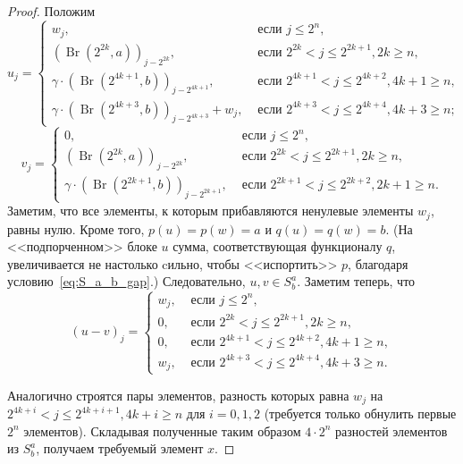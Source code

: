 \begin{proof}
	Положим
	\begin{equation}
		u_j = \begin{cases}
			w_j,  & \mbox{~если~} j \leq 2^n,
			\\
			(\operatorname{Br}(2^{2k  },a))_{j-2^{2k}},  & \mbox{~если~} 2^{2k} < j \leq 2^{2k+1}, 2k \geq n,
			\\
			\gamma\cdot(\operatorname{Br}(2^{4k+1},b))_{j-2^{4k+1}},  & \mbox{~если~} 2^{4k+1} < j \leq 2^{4k+2}, 4k + 1 \geq n,
			\\
			\gamma\cdot(\operatorname{Br}(2^{4k+3},b))_{j-2^{4k+3}} + w_j,  & \mbox{~если~} 2^{4k+3} < j \leq 2^{4k+4}, 4k + 3 \geq n
			;
		\end{cases}
	\end{equation}
	\begin{equation}
		v_j = \begin{cases}
			0,  & \mbox{~если~} j \leq 2^n,
			\\
			(\operatorname{Br}(2^{2k  },a))_{j-2^{2k  }},  & \mbox{~если~} 2^{2k  } < j \leq 2^{2k+1}, 2k   \geq n,
			\\
			\gamma\cdot(\operatorname{Br}(2^{2k+1},b))_{j-2^{2k+1}},  & \mbox{~если~} 2^{2k+1} < j \leq 2^{2k+2}, 2k+1 \geq n
			.
		\end{cases}
	\end{equation}
	Заметим, что все элементы, к которым прибавляются ненулевые элементы $w_j$, равны нулю.
	Кроме того, $p(u)=p(w)=a$ и $q(u)=q(w)=b$.
	(На <<подпорченном>> блоке $u$ сумма, соответствующая функционалу $q$,
	увеличивается не настолько cильно, чтобы <<испортить>> $p$,
	благодаря условию~\eqref{eq:S_a_b_gap}.)
	Следовательно, $u,v\in S^a_b$.
	Заметим теперь, что
	\begin{equation}
		(u-v)_j = \begin{cases}
			w_j,  & \mbox{~если~} j \leq 2^n,
			\\
			0,  & \mbox{~если~} 2^{2k  } < j \leq 2^{2k+1}, 2k    \geq n,
			\\
			0,  & \mbox{~если~} 2^{4k+1} < j \leq 2^{4k+2}, 4k + 1 \geq n,
			\\
			w_j,  & \mbox{~если~} 2^{4k+3} < j \leq 2^{4k+4}, 4k + 3 \geq n
			.
		\end{cases}
	\end{equation}

	Аналогично строятся пары элементов, разность которых равна $w_j$ на $2^{4k+i} < j \leq 2^{4k+i+1}, 4k + i \geq n$ для $i=0,1,2$
	(требуется только обнулить первые $2^n$ элементов).
	Складывая полученные таким образом $4\cdot 2^n$ разностей элементов из $S^a_b$, получаем требуемый элемент $x$.

\end{proof}

